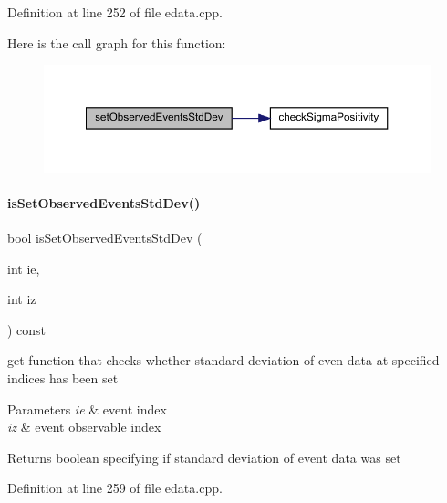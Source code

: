 Definition at line 252 of file edata.\+cpp.

Here is the call graph for this function\+:
\nopagebreak
\begin{figure}[H]
\begin{center}
\leavevmode
\includegraphics[width=350pt]{classamici_1_1_exp_data_a2533798d195c8ede07c783800adf1d82_cgraph}
\end{center}
\end{figure}
\mbox{\label{classamici_1_1_exp_data_a29530529cf50b9fa791e02fed620ea7a}} 
\paragraph{\texorpdfstring{is\+Set\+Observed\+Events\+Std\+Dev()}{isSetObservedEventsStdDev()}}
{\footnotesize\ttfamily bool is\+Set\+Observed\+Events\+Std\+Dev (\begin{DoxyParamCaption}\item[{int}]{ie,  }\item[{int}]{iz }\end{DoxyParamCaption}) const}

get function that checks whether standard deviation of even data at specified indices has been set


\begin{DoxyParams}{Parameters}
{\em ie} & event index \\
\hline
{\em iz} & event observable index \\
\hline
\end{DoxyParams}
\begin{DoxyReturn}{Returns}
boolean specifying if standard deviation of event data was set 
\end{DoxyReturn}


Definition at line 259 of file edata.\+cpp.

